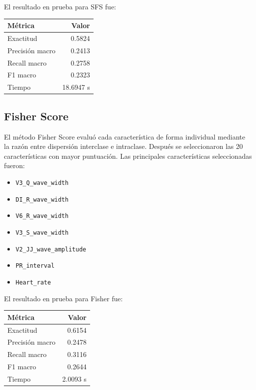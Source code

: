 \documentclass{article}
\begin{document}
El resultado en prueba para SFS fue:

\begin{center}
\begin{tabular}{lr}
\toprule
Métrica & Valor \\
\midrule
Exactitud & 0.5824 \\
Precisión macro & 0.2413 \\
Recall macro & 0.2758 \\
F1 macro & 0.2323 \\
Tiempo & 18.6947 s \\
\bottomrule
\end{tabular}
\end{center}

\subsection{Fisher Score}

El método Fisher Score evaluó cada característica de forma individual mediante la razón entre dispersión interclase e intraclase. Después se seleccionaron las 20 características con mayor puntuación. Las principales características seleccionadas fueron:

\begin{itemize}
    \item \texttt{V3\_Q\_wave\_width}
    \item \texttt{DI\_R\_wave\_width}
    \item \texttt{V6\_R\_wave\_width}
    \item \texttt{V3\_S\_wave\_width}
    \item \texttt{V2\_JJ\_wave\_amplitude}
    \item \texttt{PR\_interval}
    \item \texttt{Heart\_rate}
\end{itemize}

El resultado en prueba para Fisher fue:

\begin{center}
\begin{tabular}{lr}
\toprule
Métrica & Valor \\
\midrule
Exactitud & 0.6154 \\
Precisión macro & 0.2478 \\
Recall macro & 0.3116 \\
F1 macro & 0.2644 \\
Tiempo & 2.0093 s \\
\bottomrule
\end{tabular}
\end{center}
\end{document}
